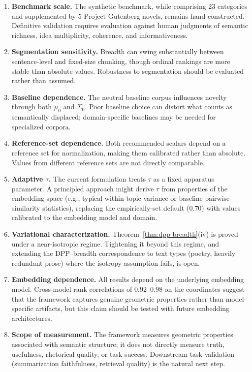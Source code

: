 \documentclass[11pt]{article}
\begin{document}
\begin{enumerate}
\item \textbf{Benchmark scale.} The synthetic benchmark, while comprising $23$ categories and supplemented by $5$ Project Gutenberg novels, remains hand-constructed. Definitive validation requires evaluation against human judgments of semantic richness, idea multiplicity, coherence, and informativeness.

\item \textbf{Segmentation sensitivity.} Breadth can swing substantially between sentence-level and fixed-size chunking, though ordinal rankings are more stable than absolute values. Robustness to segmentation should be evaluated rather than assumed.

\item \textbf{Baseline dependence.} The neutral baseline corpus influences novelty through both $\mu_0$ and $\Sigma_0$. Poor baseline choice can distort what counts as semantically displaced; domain-specific baselines may be needed for specialized corpora.

\item \textbf{Reference-set dependence.} Both recommended scalars depend on a reference set for normalization, making them calibrated rather than absolute. Values from different reference sets are not directly comparable.

\item \textbf{Adaptive $\tau$.} The current formulation treats $\tau$ as a fixed apparatus parameter. A principled approach might derive $\tau$ from properties of the embedding space (e.g., typical within-topic variance or baseline pairwise-similarity statistics), replacing the empirically-set default ($0.70$) with values calibrated to the embedding model and domain.

\item \textbf{Variational characterization.} Theorem~\ref{thm:dpp-breadth}(iv) is proved under a near-isotropic regime. Tightening it beyond this regime, and extending the DPP--breadth correspondence to text types (poetry, heavily redundant prose) where the isotropy assumption fails, is open.

\item \textbf{Embedding dependence.} All results depend on the underlying embedding model. Cross-model rank correlations of $0.92$--$0.98$ on the coordinates suggest that the framework captures genuine geometric properties rather than model-specific artifacts, but this claim should be tested with future embedding architectures.

\item \textbf{Scope of measurement.} The framework measures geometric properties associated with semantic structure; it does not directly measure truth, usefulness, rhetorical quality, or task success. Downstream-task validation (summarization faithfulness, retrieval quality) is the natural next step.
\end{enumerate}
\end{document}
